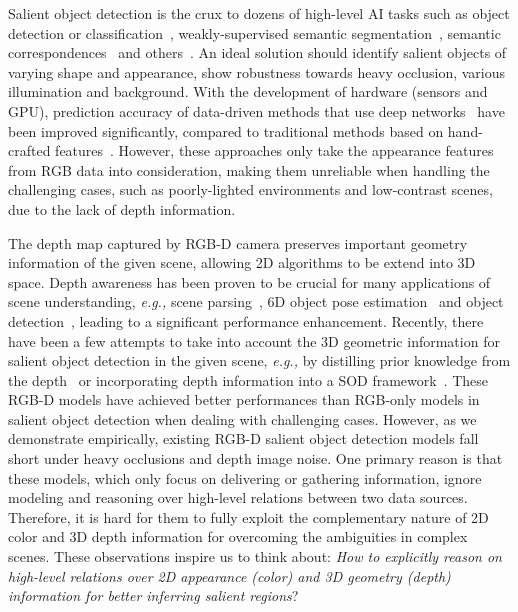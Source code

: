 \documentclass[runningheads]{llncs}
\begin{document}
Salient object detection is the crux to dozens of high-level AI tasks such as object detection or classification~\cite{ren2013region,zhang2017bridging,xie2019attentive}, weakly-supervised semantic segmentation~\cite{jin2017webly,wang2018weakly}, semantic correspondences~\cite{Yang_2017_CVPR} and others~\cite{li2017visual,xu2015show,xie2019srsc}. An ideal solution should identify salient objects of varying shape and appearance, show robustness towards heavy occlusion, various illumination and background. With the development of hardware (sensors and GPU), prediction accuracy of data-driven methods that use deep networks~\cite{Zhao_2019_ICCV,Liu_2019_ICCV,Xu_2019_ICCV,Su_2019_ICCV,Zeng_2019_ICCV,Wu_2019_ICCV,Wu_2019_CVPR,Zhang_2019_CVPR,Fan_2019_CVPR,Chen_2018_ECCV,Li_2018_ECCV} have been improved significantly, compared to traditional methods based on hand-crafted features~\cite{liu2010learning,cheng2014global,zhang2013saliency,zhang2015minimum}. However, these approaches only take the appearance features from RGB data into consideration, making them unreliable when handling the challenging cases, such as poorly-lighted environments and low-contrast scenes, due to the lack of depth information. 


The depth map captured by RGB-D camera preserves important geometry information of the given scene, allowing 2D algorithms to be extend into 3D space. Depth awareness has been proven to be crucial for many applications of scene understanding, \emph{e.g.,} scene parsing~\cite{wang2018depth,Jiao_2019_CVPR}, 6D object pose estimation~\cite{wang2019densefusion,he2019pvn3d} and object detection~\cite{gupta2014learning,qi2018frustum}, leading to a significant performance enhancement. Recently, there have been a few attempts to take into account the 3D geometric information for salient object detection in the given scene, \emph{e.g.,} by distilling prior knowledge from the depth~\cite{ren2015exploiting} or incorporating depth information into a SOD framework~\cite{Zhao_2019_CVPR,Piao_2019_ICCV,fan2019rethinking}. These RGB-D models have achieved better performances than RGB-only models in salient object detection when dealing with challenging cases. However, as we demonstrate empirically, existing RGB-D salient object detection models fall short under heavy occlusions and depth image noise. One primary reason is that these models, which only focus on delivering or gathering information, ignore {modeling and reasoning over high-level  relations} between two data sources. Therefore, it is hard for them to fully exploit the complementary nature of 2D color and 3D depth information for overcoming the ambiguities in complex scenes. These observations inspire us to think about: \textit {How to explicitly reason on high-level relations over 2D appearance (color) and 3D geometry (depth) information for better inferring salient regions}? 
\end{document}
